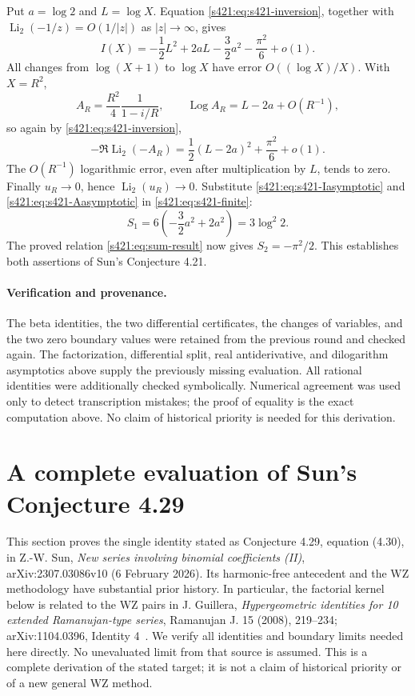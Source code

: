 \documentclass[11pt,a4paper]{article}
\theoremstyle{remark}\newtheorem{remark}[theorem]{Remark}
\numberwithin{equation}{section}
\begin{document}
Put $a=\log2$ and $L=\log X$. Equation
\eqref{s421:eq:s421-inversion}, together with
$\operatorname{Li}_2(-1/z)=O(1/|z|)$ as $|z|\to\infty$, gives
\begin{equation}\label{s421:eq:s421-Iasymptotic}
 I(X)=-\frac12 L^2+2aL-\frac32a^2-\frac{\pi^2}{6}+o(1).
\end{equation}
All changes from $\log(X+1)$ to $\log X$ have error
$O((\log X)/X)$. With $X=R^2$,
\[
 A_R=\frac{R^2}{4}\frac1{1-i/R},\qquad
 \operatorname{Log}A_R=L-2a+O(R^{-1}),
\]
so again by \eqref{s421:eq:s421-inversion},
\begin{equation}\label{s421:eq:s421-Aasymptotic}
 -\Re\operatorname{Li}_2(-A_R)
 =\frac12(L-2a)^2+\frac{\pi^2}{6}+o(1).
\end{equation}
The $O(R^{-1})$ logarithmic error, even after multiplication by
$L$, tends to zero. Finally $u_R\to0$, hence
$\operatorname{Li}_2(u_R)\to0$.
Substitute \eqref{s421:eq:s421-Iasymptotic} and
\eqref{s421:eq:s421-Aasymptotic} in \eqref{s421:eq:s421-finite}:
\[
 S_1=6\left(-\frac32a^2+2a^2\right)=3\log^2 2.
\]
The proved relation \eqref{s421:eq:sum-result} now gives
$S_2=-\pi^2/2$. This establishes both assertions of Sun's
Conjecture 4.21.

\paragraph{Verification and provenance.}
The beta identities, the two differential certificates, the changes of
variables, and the two zero boundary values were retained from the
previous round and checked again. The factorization, differential
split, real antiderivative, and dilogarithm asymptotics above supply the
previously missing evaluation. All rational identities were additionally
checked symbolically. Numerical agreement was used only to detect
transcription mistakes; the proof of equality is the exact computation
above. No claim of historical priority is needed for this derivation.

\clearpage
\section{A complete evaluation of Sun's Conjecture 4.29}
\label{sec:sun429}

This section proves the single identity stated as Conjecture 4.29,
equation (4.30), in Z.-W. Sun, \emph{New series involving binomial
coefficients (II)}, arXiv:2307.03086v10 (6 February 2026).
Its harmonic-free antecedent and the WZ methodology have substantial
prior history. In particular, the factorial kernel below is related to
the WZ pairs in J. Guillera, \emph{Hypergeometric identities for 10
extended Ramanujan-type series}, Ramanujan J. 15 (2008), 219--234;
arXiv:1104.0396, Identity 4~\cite{Guillera}. We verify all identities and boundary limits
needed here directly. No unevaluated limit from that source is assumed.
This is a complete derivation of the stated target; it is not a claim of
historical priority or of a new general WZ method.
\end{document}
